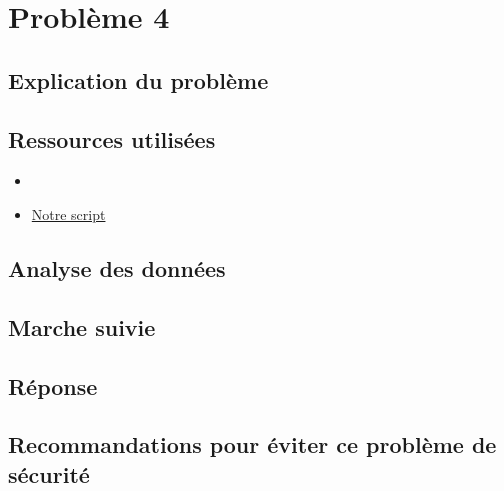 \section{Problème 4}

\subsection{Explication du problème}

\subsection{Ressources utilisées}

\begin{itemize}
    \item 
    \item \href{}{Notre script}
\end{itemize}

\subsection{Analyse des données}

\subsection{Marche suivie}

\subsection{Réponse}

\subsection{Recommandations pour éviter ce problème de sécurité}
